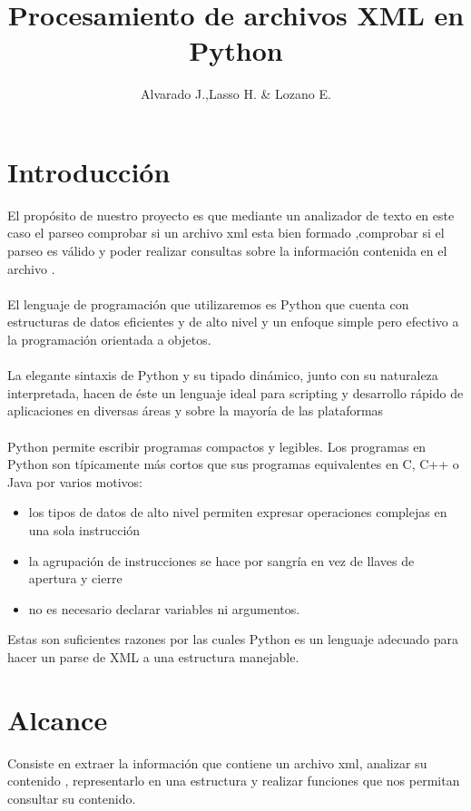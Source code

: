 \documentclass[11pt]{article} %
\title{Procesamiento de archivos  XML  en Python}
\author{Alvarado J.,Lasso H. \&  Lozano E.}
\begin{document}
\maketitle

\section{Introducción}
El propósito de nuestro proyecto es que  mediante un analizador de texto en este caso el parseo comprobar si un archivo xml esta bien formado ,comprobar si el parseo es válido y poder realizar consultas sobre la información contenida en el archivo .\\ \\
El lenguaje de programación que utilizaremos es Python que cuenta con estructuras de datos eficientes y de alto
nivel y un enfoque simple pero efectivo a la programación orientada a objetos.\\ \\
La elegante sintaxis de Python y su tipado dinámico, junto con su naturaleza interpretada, hacen de éste un lenguaje ideal para scripting y desarrollo rápido de aplicaciones en diversas áreas y sobre la mayoría de las plataformas\\ \\
Python permite escribir programas compactos y legibles. Los programas en Python son típicamente más cortos que sus
programas equivalentes en C, C++ o Java por varios motivos:
\begin{itemize}
\item los tipos de datos de alto nivel permiten expresar operaciones complejas en una sola instrucción
\item la agrupación de instrucciones se hace por sangría en vez de llaves de apertura y cierre
\item  no es necesario declarar variables ni argumentos.
\end{itemize}
Estas son suficientes razones por las cuales Python es un lenguaje adecuado para hacer un parse de XML a una estructura manejable.

\section{Alcance}
Consiste en extraer la información que contiene un archivo xml, analizar su contenido , representarlo en una estructura y realizar funciones que nos permitan consultar su contenido.
\end{document}
